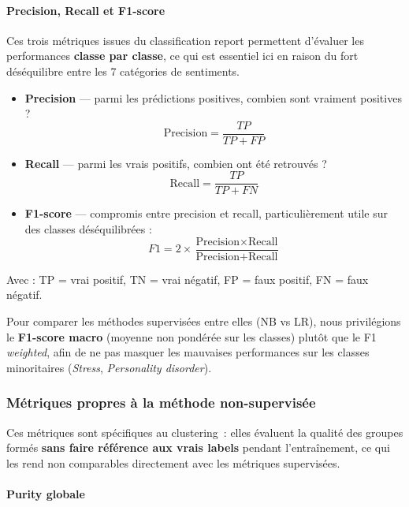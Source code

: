 \documentclass[12pt,a4paper]{article}
\begin{document}
\paragraph{Precision, Recall et F1-score}

Ces trois métriques issues du classification report permettent d'évaluer les performances \textbf{classe par classe}, ce qui est essentiel ici en raison du fort déséquilibre entre les 7 catégories de sentiments.

\begin{itemize}
  \item \textbf{Precision} --- parmi les prédictions positives, combien sont vraiment positives ?
  \[
    \text{Precision} = \frac{TP}{TP + FP}
  \]
  \item \textbf{Recall} --- parmi les vrais positifs, combien ont été retrouvés ?
  \[
    \text{Recall} = \frac{TP}{TP + FN}
  \]
  \item \textbf{F1-score} --- compromis entre precision et recall, particulièrement utile sur des classes déséquilibrées :
  \[
    F1 = 2 \times \frac{\text{Precision} \times \text{Recall}}{\text{Precision} + \text{Recall}}
  \]
\end{itemize}

Avec : TP = vrai positif, TN = vrai négatif, FP = faux positif, FN = faux négatif.

\begin{remarque}
Pour comparer les méthodes supervisées entre elles (NB vs LR), nous privilégions le \textbf{F1-score macro} (moyenne non pondérée sur les classes) plutôt que le F1 \textit{weighted}, afin de ne pas masquer les mauvaises performances sur les classes minoritaires (\textit{Stress}, \textit{Personality disorder}).
\end{remarque}

\subsubsection{Métriques propres à la méthode non-supervisée}

Ces métriques sont spécifiques au clustering~: elles évaluent la qualité des groupes formés \textbf{sans faire référence aux vrais labels} pendant l'entraînement, ce qui les rend non comparables directement avec les métriques supervisées.

\paragraph{Purity globale}
\end{document}
